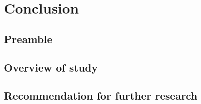 \chapter{Conclusion}
\label{chap:4}

\section{Preamble}

\section{Overview of study}

\section{Recommendation for further research}